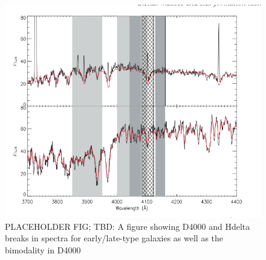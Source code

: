 \begin{figure}
\includegraphics[width=\textwidth]{figures/spectra_placeholder.png}
\caption[PLACEHOLDER FIG; TBD: A figure showing D4000 and Hdelta breaks in spectra for early/late-type galaxies as well as the bimodality in D4000
]{ PLACEHOLDER FIG; TBD: A figure showing D4000 and Hdelta breaks in spectra for early/late-type galaxies as well as the bimodality in D4000
\label{fig:early_late_type}}
\end{figure}


